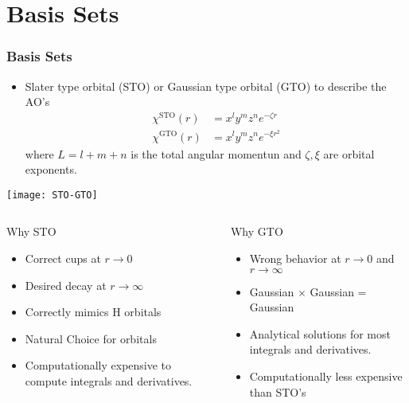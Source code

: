\documentclass[slidestop,mathserif,compress,xcolor=svgnames]{beamer}
\begin{document}
\section{Basis Sets}
\begin{frame}
\frametitle{\small Basis Sets}
\footnotesize{
\begin{itemize}
\item %
Slater type orbital (STO) or Gaussian type orbital (GTO) to describe the AO's
\begin{align*}
\chi^{\mathrm{STO}}(r) &= x^ly^mz^ne^{-\zeta r}\\
\chi^{\mathrm{GTO}}(r) &= x^ly^mz^ne^{-\xi r^2}
\end{align*}
where $L=l+m+n$ is the total angular momentun and $\zeta,\xi$ are orbital exponents. 
\end{itemize}
\begin{center}
\texttt{[image: STO-GTO]}
\end{center}
}
\end{frame}

\begin{frame}
\footnotesize{
\begin{columns}
\column{5.5cm}
\vspace{-0.2cm}
\begin{block}{Why STO}
\begin{itemize}
\item Correct cups at $r\rightarrow0$
\item Desired decay at $r\rightarrow\infty$ 
\item Correctly mimics H orbitals
\item Natural Choice for orbitals
\item Computationally expensive to compute integrals and derivatives.
\end{itemize}
\end{block}
\column{5.5cm}
\vspace{-0.2cm}
\begin{block}{Why GTO}
\begin{itemize}
\item Wrong behavior at $r\rightarrow0$ and $r\rightarrow\infty$
\item Gaussian $\times$ Gaussian = Gaussian
\item Analytical solutions for most integrals and derivatives.
\item Computationally less expensive than STO's
\end{itemize}
\end{block}
\end{columns}
}
\end{frame}
\end{document}
